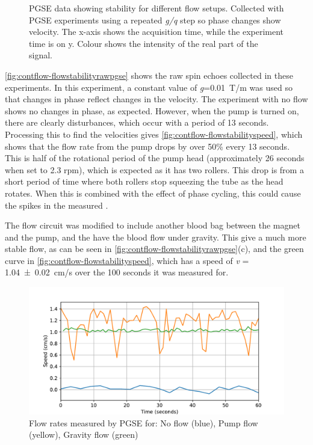 \begin{figure}[ht]
\caption[PGSE data showing flow stability]{PGSE data showing stability for different flow setups. Collected with PGSE experiments using a repeated \textit{g/q} step so phase changes show velocity. The x-axis shows the acquisition time, while the experiment time is on y. Colour shows the intensity of the real part of the signal.}
\label{fig:contflow-flowstabilityrawpgse}
\end{figure}

\autoref{fig:contflow-flowstabilityrawpgse} shows the raw spin echoes collected in these experiments.
In this experiment, a constant value of \textit{g}=\SI{0.01}{T/m} was used so that changes in phase reflect changes in the velocity.
The experiment with no flow shows no changes in phase, as expected.
However, when the pump is turned on, there are clearly disturbances, which occur with a period of 13 seconds.
Processing this to find the velocities gives \autoref{fig:contflow-flowstabilityspeed}, which shows that the flow rate from the pump drops by over 50\% every 13 seconds.
This is half of the rotational period of the pump head (approximately 26 seconds when set to 2.3 rpm), which is expected as it has two rollers.
This drop is from a short period of time where both rollers stop squeezing the tube as the head rotates.
When this is combined with the effect of phase cycling, this could cause the spikes in the measured \Ttwo.

The flow circuit was modified to include another blood bag between the magnet and the pump, and the have the blood flow under gravity.
This give a much more stable flow, as can be seen in \autoref{fig:contflow-flowstabilityrawpgse}(c), and the green curve in \autoref{fig:contflow-flowstabilityspeed}, which has a speed of \textit{v} = \SI{1.04\pm0.02}{cm/s} over the 100 seconds it was measured for.

\begin{figure}[ht]
\centering
\includegraphics[width=\textwidth]{figures/contflow/flowstabilityspeed.pdf}
\caption[Flow rate stability for different continuous flow setups]{Flow rates measured by PGSE for: No flow (blue), Pump flow (yellow), Gravity flow (green)}
\label{fig:contflow-flowstabilityspeed}
\end{figure}

